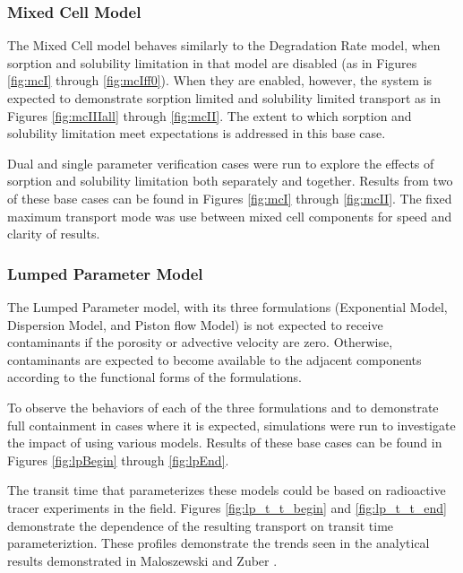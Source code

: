 \subsubsection{Mixed Cell Model}
The Mixed Cell model behaves similarly to the Degradation Rate model, when 
sorption and solubility limitation in that model are disabled (as in Figures 
\ref{fig:mcI} through \ref{fig:mcIff0}). When they are enabled, however, the 
system is expected to demonstrate sorption limited and solubility limited 
transport as in Figures \ref{fig:mcIIIall} through \ref{fig:mcII}. The extent 
to which sorption and solubility limitation meet expectations is addressed in 
this base case.  

Dual and single parameter verification cases were run to explore the effects of 
sorption and solubility limitation both separately and together.  Results from 
two of these base cases can be found in Figures \ref{fig:mcI} through 
\ref{fig:mcII}.
The fixed maximum transport mode was use between mixed cell components for speed 
and clarity of results.


\FloatBarrier

\subsubsection{Lumped Parameter Model}
The Lumped Parameter model, with its three formulations (Exponential Model, 
Dispersion Model, and Piston flow Model) is not expected to receive 
contaminants if the porosity or advective velocity are zero. Otherwise, 
contaminants are expected to  become available to the adjacent components 
according to the functional forms of the formulations. 

To observe the behaviors of each of the three formulations and to demonstrate 
full containment in cases where it is expected, simulations were run to 
investigate the impact of using various models. Results of these base cases can be found in Figures 
\ref{fig:lpBegin} through \ref{fig:lpEnd}.



The transit time that parameterizes these models could be based on radioactive 
tracer experiments in the field. Figures \ref{fig:lp_t_t_begin} 
and \ref{fig:lp_t_t_end} demonstrate the dependence of the resulting transport on 
transit time parameteriztion. These profiles demonstrate the trends seen in the 
analytical results demonstrated in Maloszewski and Zuber 
\cite{maloszewski_lumped_1996}.

